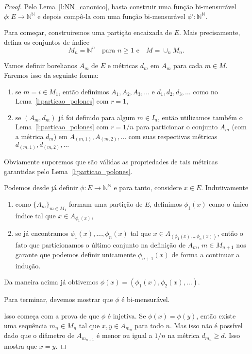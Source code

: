 \documentclass[reqno, draft]{book}
\newcommand*\1{\mathds{1}}
\begin{document}
\begin{proof}
  Pelo Lema~\ref{l:NN_canonico}, basta construir uma função bi-mensurável $\phi:E \to \mathbb{N}^\mathbb{N}$ e depois compô-la com uma função bi-mensurável $\phi':\mathbb{N}^\mathbb{N}$.

  Para começar, construiremos uma partição encaixada de $E$.
  Mais precisamente, defina os conjuntos de índice
  \begin{equation}
    M_n = \mathbb{N}^n \quad \text{para $n \geq 1$ e} \quad M = \cup_n M_n.
  \end{equation}

  Vamos definir borelianos $A_m$ de $E$ e métricas $d_m$ em $A_m$ para cada $m \in M$.
  Faremos isso da seguinte forma:
  \begin{enumerate}[\quad a)]
  \item se $m = i \in M_1$, então definimos $A_1, A_2, A_3, \dots$ e $d_1, d_2, d_3, \dots$ como no Lema~\ref{l:particao_polones} com $r = 1$,
  \item se $(A_m, d_m)$ já foi definido para algum $m \in I_n$, então utilizamos também o Lema~\ref{l:particao_polones} com $r = 1/n$ para particionar o conjunto $A_m$ (com a métrica $d_m$) em $A_{(m,1)}, A_{(m,2)}, \dots$ com suas respectivas métricas $d_{(m,1)}, d_{(m,2)}, \dots$
  \end{enumerate}
  Obviamente suporemos que são válidas as propriedades de tais métricas garantidas pelo Lema~\ref{l:particao_polones}.

  Podemos desde já definir $\phi:E \to \mathbb{N}^\mathbb{N}$ e para tanto, considere $x \in E$.
  Indutivamente
  \begin{enumerate}[\quad a)]
  \item como $\{A_m\}_{m \in M_1}$ formam uma partição de $E$, definimos $\phi_1(x)$ como o único índice tal que $x \in A_{\phi_1(x)}$,
  \item se já encontramos $\phi_1(x), \dots, \phi_n(x)$ tal que $x \in A_{(\phi_1(x), \dots \phi_n(x))}$, então o fato que particionamos o último conjunto na definição de $A_m$, $m \in M_{n+1}$ nos garante que podemos definir unicamente $\phi_{n+1}(x)$ de forma a continuar a indução.
  \end{enumerate}
  Da maneira acima já obtivemos $\phi(x) = (\phi_1(x), \phi_2(x), \dots)$.

  Para terminar, devemos mostrar que $\phi$ é bi-mensurável.

  Isso começa com a prova de que $\phi$ é injetiva.
  Se $\phi(x) = \phi(y)$, então existe uma sequência $m_n \in M_n$ tal que $x, y \in A_{m_n}$ para todo $n$.
  Mas isso não é possível dado que o diâmetro de $A_{m_{n+1}}$ é menor ou igual a $1/n$ na métrica $d_{m_n} \geq d$.
  Isso mostra que $x = y$.


\end{proof}
\end{document}
